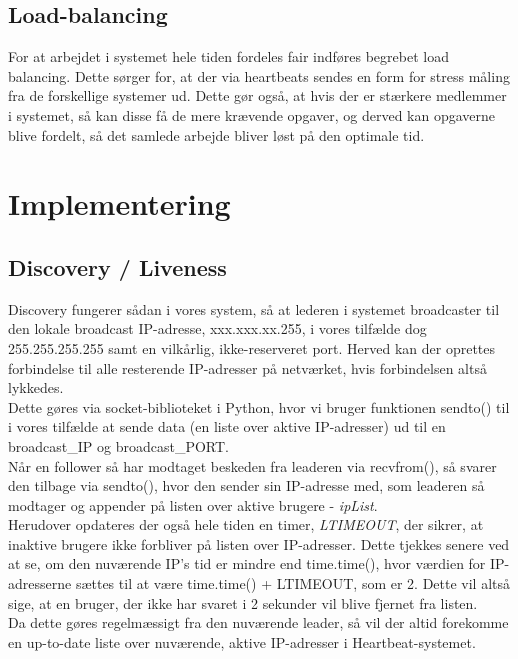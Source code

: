 \documentclass[a4paper,12pt]{article}
\begin{document}
\subsection*{Load-balancing}
For at arbejdet i systemet hele tiden fordeles fair indføres begrebet load balancing. Dette sørger for, at der via heartbeats sendes en form for stress måling fra de forskellige systemer ud. Dette gør også, at hvis der er stærkere medlemmer i systemet, så kan disse få de mere krævende opgaver, og derved kan opgaverne blive fordelt, så det samlede arbejde bliver løst på den optimale tid.



\section*{Implementering}

\subsection*{Discovery / Liveness}
Discovery fungerer sådan i vores system, så at lederen i systemet broadcaster til den lokale broadcast IP-adresse, xxx.xxx.xx.255, i vores tilfælde dog 255.255.255.255 samt en vilkårlig, ikke-reserveret port. Herved kan der oprettes forbindelse til alle resterende IP-adresser på netværket, hvis forbindelsen altså lykkedes.
\\[5px]
Dette gøres via socket-biblioteket i Python, hvor vi bruger funktionen sendto() til i vores tilfælde at sende data (en liste over aktive IP-adresser) ud til en broadcast\_IP og broadcast\_PORT.
\\
Når en follower så har modtaget beskeden fra leaderen via recvfrom(), så svarer den tilbage via sendto(), hvor den sender sin IP-adresse med, som leaderen så modtager og appender på listen over aktive brugere - \textit{ipList}.
\\
Herudover opdateres der også hele tiden en timer, \textit{LTIMEOUT}, der sikrer, at inaktive brugere ikke forbliver på listen over IP-adresser. Dette tjekkes senere ved at se, om den nuværende IP's tid er mindre end time.time(), hvor værdien for IP-adresserne sættes til at være time.time() + LTIMEOUT, som er 2. Dette vil altså sige, at en bruger, der ikke har svaret i 2 sekunder vil blive fjernet fra listen.
\\[5px]
Da dette gøres regelmæssigt fra den nuværende leader, så vil der altid forekomme en up-to-date liste over nuværende, aktive IP-adresser i Heartbeat-systemet.
\end{document}
